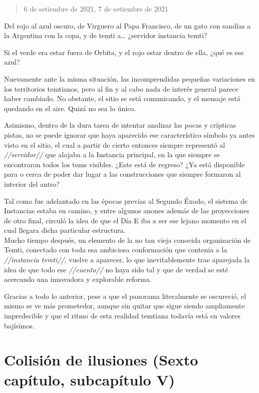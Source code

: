 \documentclass[
  spanish,
]{book}
\begin{document}
\begin{quote}
6 de setiembre de 2021, 7 de setiembre de 2021
\end{quote}

Del rojo al azul oscuro, de Virguero al Papa Francisco, de un gato con sandías a la Argentina con la copa, y de temti a\ldots{} ¿servidor instancia temti?

Si el verde era estar fuera de Orbita, y el rojo estar dentro de ella, ¿qué es ese azul?

Nuevamente ante la misma situación, las incomprendidas pequeñas variaciones en los territorios temtianos, pero al fin y al cabo nada de interés general parece haber cambiado. No obstante, el sitio se está comunicando, y el mensaje está quedando en el aire. Quizá no sea lo único.

Asimismo, dentro de la dura tarea de intentar analizar las pocas y crípticas pistas, no se puede ignorar que haya aparecido ese característico símbolo ya antes visto en el sitio, el cual a partir de cierto entonces siempre representó al \emph{//servidor//} que alojaba a la Instancia principal, en la que siempre se encontraron todos los tems visibles. ¿Este está de regreso? ¿Ya está disponible para o cerca de poder dar lugar a las construcciones que siempre formaron al interior del antro?

Tal como fue adelantado en las épocas previas al Segundo Éxodo, el sistema de Instancias estaba en camino, y entre algunos anones además de las proyecciones de otro final, circuló la idea de que el Día E iba a ser ese lejano momento en el cual llegara dicha particular estructura.\\
Mucho tiempo después, un elemento de la no tan vieja conocida organización de Temti, conectado con toda esa ambiciosa conformación que contenía a la \emph{//instancia temti//}, vuelve a aparecer, lo que inevitablemente trae aparejada la idea de que todo ese \emph{//cuento//} no haya sido tal y que de verdad se esté acercando una innovadora y explorable reforma.

Gracias a todo lo anterior, pese a que el panorama literalmente se oscureció, el mismo se ve más prometedor, aunque sin quitar que sigue siendo ampliamente impredecible y que el ritmo de esta realidad temtiana todavía está en valores bajísimos.

\hypertarget{colisiuxf3n-de-ilusiones-sexto-capuxedtulo-subcapuxedtulo-v}{%
\section{Colisión de ilusiones (Sexto capítulo, subcapítulo V)}\label{colisiuxf3n-de-ilusiones-sexto-capuxedtulo-subcapuxedtulo-v}}
\end{document}
